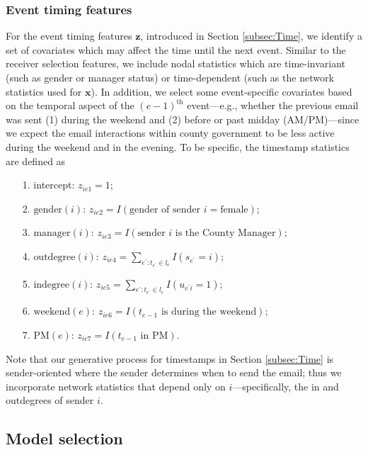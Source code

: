 \documentclass[ba]{imsart}
\numberwithin{equation}{section}
\theoremstyle{plain}
\begin{document}
	\subsubsection{Event timing features}
For the event timing features $\boldsymbol{z}$, introduced in Section \ref{subsec:Time}, we identify a set of covariates which may affect the time until the next event. Similar to the receiver selection features, we include nodal statistics which are time-invariant (such as gender or manager status) or time-dependent (such as the network statistics used for $\boldsymbol{x}$). In addition, we select some event-specific covariates based on the temporal aspect of the $(e-1)^{\textrm{th}}$ event---e.g., whether the previous email was sent (1) during the weekend and (2) before or past midday (AM/PM)---since we expect the email interactions within county government to be less active during the weekend and in the evening. To be specific, the timestamp statistics are defined as
	\begin{itemize}
		\item[1.] intercept: ${z}_{ie1} =1$;
		\item[2.] $\mbox{gender}(i)$: ${z}_{ie2}=I(\mbox{gender of sender }i= \mbox{female})$;
		\item[3.] $\mbox{manager}(i)$: ${z}_{ie3}=I(\mbox{sender }i \mbox{ is the County Manager})$;
		\item[4.] $\mbox{outdegree}(i)$: ${z}_{ie4} =\sum_{e^\prime: t_{e^\prime} \in l_e} I(s_{e^\prime} = i)$;
		\item[5.] $\mbox{indegree}(i)$: ${z}_{ie5}=\sum_{e^\prime: t_{e^\prime} \in l_e} I(u_{e^\prime i} = 1)$;
		\item[6.] $\mbox{weekend}(e)$: ${z}_{ie6} = I(t_{e-1} \mbox{ is during the } \mbox{weekend})$;
		\item[7.] $\mbox{PM}(e)$: ${z}_{ie7}= I(t_{e-1} \mbox{ in } \mbox{PM})$.
	\end{itemize}
	Note that our generative process for timestamps in Section \ref{subsec:Time} is sender-oriented where the sender determines when to send the email; thus we incorporate network statistics that depend only on $i$---specifically, the in and outdegrees of sender $i$. 
	
	\subsection{Model selection}\label{subsec:Experiment_email}
	
\end{document}
